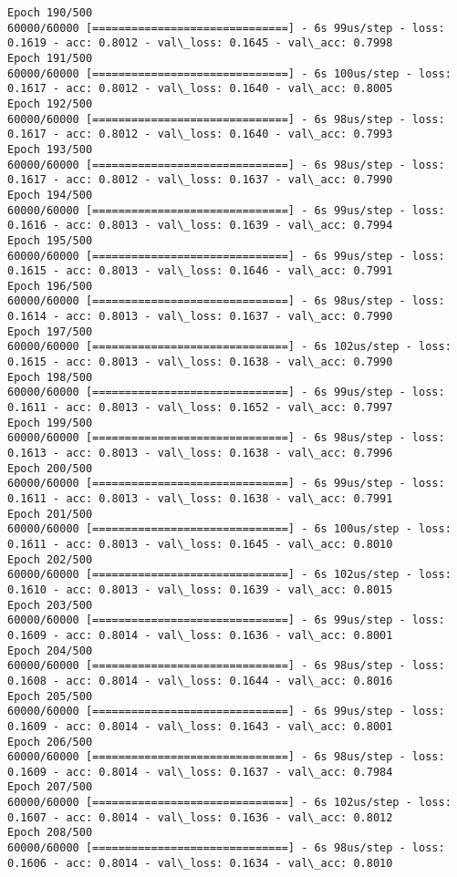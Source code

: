 \documentclass[11pt]{article}
\begin{document}
\begin{Verbatim}[commandchars=\\\{\}]
Epoch 190/500
60000/60000 [==============================] - 6s 99us/step - loss: 0.1619 - acc: 0.8012 - val\_loss: 0.1645 - val\_acc: 0.7998
Epoch 191/500
60000/60000 [==============================] - 6s 100us/step - loss: 0.1617 - acc: 0.8012 - val\_loss: 0.1640 - val\_acc: 0.8005
Epoch 192/500
60000/60000 [==============================] - 6s 98us/step - loss: 0.1617 - acc: 0.8012 - val\_loss: 0.1640 - val\_acc: 0.7993
Epoch 193/500
60000/60000 [==============================] - 6s 98us/step - loss: 0.1617 - acc: 0.8012 - val\_loss: 0.1637 - val\_acc: 0.7990
Epoch 194/500
60000/60000 [==============================] - 6s 99us/step - loss: 0.1616 - acc: 0.8013 - val\_loss: 0.1639 - val\_acc: 0.7994
Epoch 195/500
60000/60000 [==============================] - 6s 99us/step - loss: 0.1615 - acc: 0.8013 - val\_loss: 0.1646 - val\_acc: 0.7991
Epoch 196/500
60000/60000 [==============================] - 6s 98us/step - loss: 0.1614 - acc: 0.8013 - val\_loss: 0.1637 - val\_acc: 0.7990
Epoch 197/500
60000/60000 [==============================] - 6s 102us/step - loss: 0.1615 - acc: 0.8013 - val\_loss: 0.1638 - val\_acc: 0.7990
Epoch 198/500
60000/60000 [==============================] - 6s 99us/step - loss: 0.1611 - acc: 0.8013 - val\_loss: 0.1652 - val\_acc: 0.7997
Epoch 199/500
60000/60000 [==============================] - 6s 98us/step - loss: 0.1613 - acc: 0.8013 - val\_loss: 0.1638 - val\_acc: 0.7996
Epoch 200/500
60000/60000 [==============================] - 6s 99us/step - loss: 0.1611 - acc: 0.8013 - val\_loss: 0.1638 - val\_acc: 0.7991
Epoch 201/500
60000/60000 [==============================] - 6s 100us/step - loss: 0.1611 - acc: 0.8013 - val\_loss: 0.1645 - val\_acc: 0.8010
Epoch 202/500
60000/60000 [==============================] - 6s 102us/step - loss: 0.1610 - acc: 0.8013 - val\_loss: 0.1639 - val\_acc: 0.8015
Epoch 203/500
60000/60000 [==============================] - 6s 99us/step - loss: 0.1609 - acc: 0.8014 - val\_loss: 0.1636 - val\_acc: 0.8001
Epoch 204/500
60000/60000 [==============================] - 6s 98us/step - loss: 0.1608 - acc: 0.8014 - val\_loss: 0.1644 - val\_acc: 0.8016
Epoch 205/500
60000/60000 [==============================] - 6s 99us/step - loss: 0.1609 - acc: 0.8014 - val\_loss: 0.1643 - val\_acc: 0.8001
Epoch 206/500
60000/60000 [==============================] - 6s 98us/step - loss: 0.1609 - acc: 0.8014 - val\_loss: 0.1637 - val\_acc: 0.7984
Epoch 207/500
60000/60000 [==============================] - 6s 102us/step - loss: 0.1607 - acc: 0.8014 - val\_loss: 0.1636 - val\_acc: 0.8012
Epoch 208/500
60000/60000 [==============================] - 6s 98us/step - loss: 0.1606 - acc: 0.8014 - val\_loss: 0.1634 - val\_acc: 0.8010

\end{Verbatim}
\end{document}
